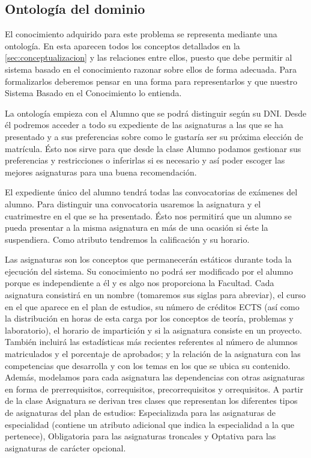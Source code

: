 
\subsection{Ontología del dominio} \label{sec:ontologia}

El conocimiento adquirido para este problema se representa mediante una
ontología. En esta aparecen todos los conceptos detallados en la
\autoref{sec:conceptualizacion} y las relaciones entre ellos, puesto que debe
permitir al sistema basado en el conocimiento razonar sobre ellos de forma
adecuada. Para formalizarlos deberemos pensar en una forma para representarlos
y que nuestro Sistema Basado en el Conocimiento lo entienda.

La ontología empieza con el Alumno que se podrá distinguir según su DNI.
Desde él podremos acceder a todo su expediente de las asignaturas a las
que se ha presentado y a sus preferencias sobre como le gustaría ser su
próxima elección de matrícula. Ésto nos sirve para que desde la clase Alumno
podamos gestionar sus preferencias y restricciones o inferirlas si es
necesario y así poder escoger las mejores asignaturas para una buena recomendación.

El expediente único del alumno tendrá todas las convocatorias de exámenes
del alumno. Para distinguir una convocatoria usaremos la asignatura y el
cuatrimestre en el que se ha presentado. Ésto nos permitirá que un alumno
se pueda presentar a la misma asignatura en más de una ocasión si éste la
suspendiera. Como atributo tendremos la calificación y su horario.

Las asignaturas son los conceptos que permanecerán estáticos durante toda
la ejecución del sistema. Su conocimiento no podrá ser modificado por el
alumno porque es independiente a él y es algo nos proporciona la Facultad.
Cada asignatura consistirá en un nombre (tomaremos sus siglas para abreviar),
el curso en el que aparece en el plan de estudios, su número de créditos
ECTS (así como la distribución en horas de esta carga por los conceptos de
teoría, problemas y laboratorio), el horario de impartición y si la asignatura
consiste en un proyecto. También incluirá las estadísticas más recientes
referentes al número de alumnos matriculados y el porcentaje de aprobados; y la
relación de la asignatura con las competencias que desarrolla y con los temas
en los que se ubica su contenido. Además, modelamos para cada asignatura las
dependencias con otras asignaturas en forma de prerrequisitos, correquisitos,
precorrequisitos y orrequisitos.
A partir de la clase Asignatura se derivan tres clases que representan los
diferentes tipos de asignaturas del plan de estudios: Especializada para
las asignaturas de especialidad (contiene un atributo adicional que indica
la especialidad a la que pertenece), Obligatoria para las asignaturas troncales
y Optativa para las asignaturas de carácter opcional.

